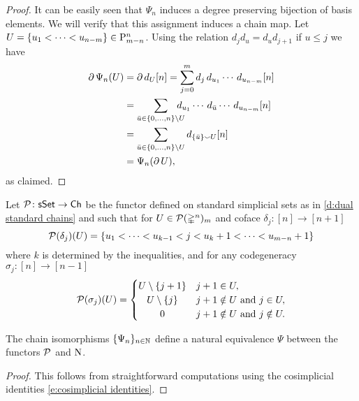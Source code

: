 \begin{proof}
	It can be easily seen that $\Psi_n$ induces a degree preserving bijection of basis elements.
	We will verify that this assignment induces a chain map.
	Let $U = \{u_1 < \cdots < u_{n-m}\} \in \mathrm{P}_{m-n}^n$.
	Using the relation $d_jd_u = d_ud_{j+1}$ if $u \leq j$ we have
	\begin{align*}
	\bd \Psi_n(U) &=
	\bd d_U[n] =
	\sum_{j=0}^{m} d_j\, d_{u_1} \cdots\, d_{u_{n-m}}[n] \\ &=
	\sum_{\bar u \in \{0, \dots, n\} \setminus U}
	\hspace*{-10pt} d_{u_1} \cdots\, d_{\bar{u}} \cdots\, d_{u_{n-m}}[n] \\ &=
	\sum_{\bar u \in \{0, \dots, n\} \setminus U} d_{\{\bar u\} \union U}[n] \\ &=
	\Psi_n(\bd U),
	\end{align*}
	as claimed.
\end{proof}

\begin{definition}
	Let $\mathcal{P} \colon \mathsf{sSet} \to \mathsf{Ch}$ be the functor defined on standard simplicial sets as in \cref{d:dual standard chains} and such that for $U \in \mathcal{P}(\mathbb{\Delta}^n)_m$ and coface $\delta_j \colon [n] \to [n+1]$
	\[
	\mathcal{P}(\delta_j)(U) = \{ u_1 < \dots < u_{k-1} < j < u_k+1 < \dots < u_{m-n}+1 \}
	\]
	where $k$ is determined by the inequalities, and for any codegeneracy $\sigma_j \colon [n] \to [n-1]$
	\begin{equation} \label{e:action of P on a codegeneracy}
	\cP(\sigma_j)(U) = \begin{cases}
	U \setminus \{j+1\} & j+1 \in U, \\
	\hfil U \setminus \{j\} & j+1 \notin U \text{ and } j \in U, \\
	\hfil 0 & j+1 \notin U \text{ and } j \notin U.
	\end{cases}
	\end{equation}
\end{definition}

\begin{lemma} \label{l:natural equivalence P and N}
	The chain isomorphisms $\{\Psi_n\}_{n \in \mathbb{N}}$ define a natural equivalence $\Psi$ between the functors $\mathcal{P}$ and $\operatorname{N}$.
\end{lemma}

\begin{proof}
	This follows from straightforward computations using the cosimplicial identities \eqref{e:cosimplicial identities}.
\end{proof}

